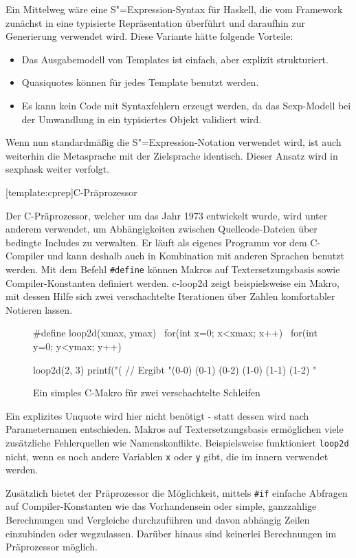 \documentclass[11pt, a4paper, bibgerm]{scrbook}
\newcommand\icode[1]{\lstinline?#1?}
\newcommand\lsection{}
\newcommand\cref{}
\newcommand\abb{}
\newcommand{\sexp}{S"=Expression}
\begin{document}
Ein Mittelweg wäre eine \sexp{}-Syntax für Haskell, die vom Framework
zunächst in eine typisierte Repräsentation überführt und daraufhin zur
Generierung verwendet wird. Diese Variante hätte folgende Vorteile:
\begin{itemize}
\item Das Ausgabemodell von Templates ist einfach, aber explizit
  strukturiert.
\item Quasiquotes können für jedes Template benutzt werden.
\item Es kann kein Code mit Syntaxfehlern erzeugt werden, da das
  Sexp-Modell bei der Umwandlung in ein typisiertes Objekt validiert wird.
\end{itemize}
Wenn nun standardmäßig die \sexp{}-Notation verwendet wird, ist auch
weiterhin die Metasprache mit der Zielsprache identisch. Dieser Ansatz
wird in \cref{sexphask} weiter verfolgt.

\lsection[template:cprep]{C-Präprozessor}

Der C-Präprozessor, welcher um das Jahr 1973 entwickelt wurde\cite{CPrep}, wird
unter anderem verwendet, um Abhängigkeiten zwischen Quellcode-Dateien
über bedingte Includes zu verwalten. Er läuft als eigenes Programm vor
dem C-Compiler und kann deshalb auch in Kombination mit anderen Sprachen
benutzt werden. Mit dem Befehl \icode{#define} können Makros auf
Textersetzungsbasis sowie Compiler-Konstanten definiert
werden. \abb{c-loop2d} zeigt beispielsweise ein Makro, mit dessen Hilfe
sich zwei verschachtelte Iterationen über Zahlen komfortabler Notieren
lassen.
\begin{figure}[h]
  \centering
  \begin{code}
#define loop2d(xmax, ymax)   \
  for(int x=0; x<xmax; x++)  \
   for(int y=0; y<ymax; y++)

loop2d(2, 3) {
  printf("(%
}
// Ergibt "(0-0) (0-1) (0-2) (1-0) (1-1) (1-2) "
  \end{code}
\caption{Ein simples C-Makro für zwei verschachtelte Schleifen}
  \label{magicl:fig:c-loop2d}
\end{figure}
Ein explizites Unquote wird hier nicht benötigt - statt dessen wird nach
Parameternamen entschieden. Makros auf Textersetzungsbasis ermöglichen
viele zusätzliche Fehlerquellen wie Namenskonflikte. Beispielsweise
funktioniert \icode{loop2d} nicht, wenn es noch andere Variablen
\icode{x} oder \icode{y} gibt, die im innern verwendet werden.

Zusätzlich bietet der Präprozessor die Möglichkeit, mittels \icode{#if}
einfache Abfragen auf Compiler-Konstanten wie das Vorhandensein oder
simple, ganzzahlige Berechnungen und Vergleiche durchzuführen und davon
abhängig Zeilen einzubinden oder wegzulassen. Darüber hinaus sind
keinerlei Berechnungen im Präprozessor möglich.
\end{document}
